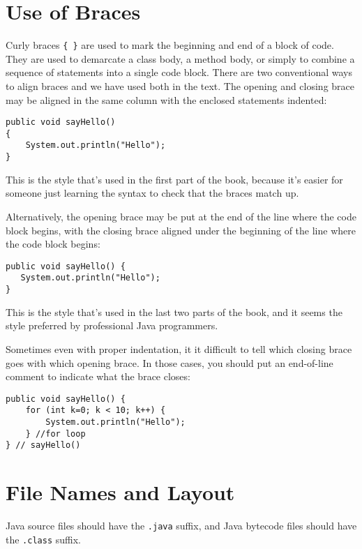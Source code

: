 \section*{Use of Braces}
\label{useof-braces}
\noindent Curly braces \verb|{ }| are used to mark the beginning and end of a
block of code.  They are used to demarcate a class body, a method body,
or simply to combine a sequence of statements into a single code
block.  There are two conventional ways to align braces and we have
used both in the text.  The opening and closing brace may be aligned in
the same column with the enclosed statements indented:

\begin{jjjlisting}
\begin{lstlisting}
public void sayHello()
{
    System.out.println("Hello");
}
\end{lstlisting}
\end{jjjlisting}

\noindent This is the style that's used in the first part of the
book, because it's easier for someone just learning the syntax
to check that the braces match up.

Alternatively, the opening brace may be put at the end of the line
where the code block begins, with the closing brace aligned under the
beginning of the line where the code block begins:

\begin{jjjlisting}
\begin{lstlisting}
public void sayHello() {
   System.out.println("Hello");
}
\end{lstlisting}
\end{jjjlisting}

\noindent This is the style that's used in the last two parts of the
book, and it seems the style preferred by professional Java programmers.

Sometimes even with proper indentation, it it difficult
to tell which closing brace goes with which opening brace.  In those
cases, you should put an end-of-line comment to indicate what the brace
closes:

\begin{jjjlisting}
\begin{lstlisting}
public void sayHello() {
    for (int k=0; k < 10; k++) {
        System.out.println("Hello");
    } //for loop
} // sayHello()
\end{lstlisting}
\end{jjjlisting}

\section*{File Names and Layout}
\label{file-namesand-layout}
\noindent Java source files should have the {\tt .java} suffix, and Java
bytecode files should have the {\tt .class} suffix.

